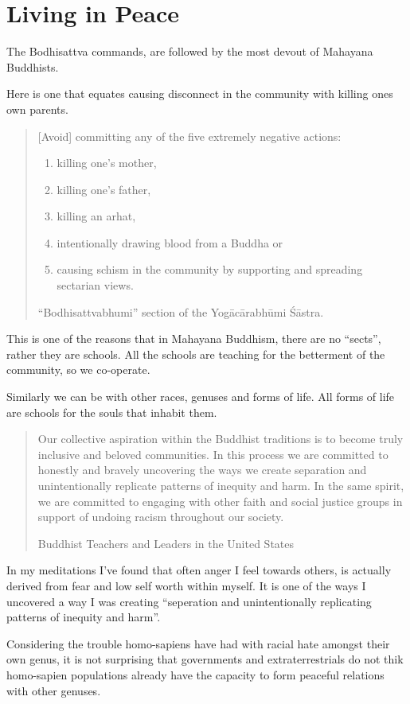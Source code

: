 
\chapter{Living in Peace}
\label{peace}

The Bodhisattva commands, are followed by the most devout of Mahayana Buddhists.

Here is one that equates causing disconnect in the community with killing ones
own parents. 
\blockquote[``Bodhisattvabhumi'' section of the Yogācārabhūmi Śāstra.]{[Avoid] 
committing any of the five extremely negative actions: 
\begin{enumerate}
  \item killing one's mother, 
  \item killing one's father, 
  \item killing an arhat, 
  \item intentionally drawing blood from a Buddha or 
  \item causing schism in the community by supporting and spreading sectarian views. 
\end{enumerate}
}

This is one of the reasons that in Mahayana Buddhism, there are no ``sects'', 
rather they are schools. All the schools are teaching for the betterment of the
community, so we co-operate. 

Similarly we can be with other races, genuses and forms of life. All forms of
life are schools for the souls that inhabit them.

\blockquote[Buddhist Teachers and Leaders in the United States\cite{racial}]{Our
 collective aspiration within the Buddhist traditions is to become truly 
inclusive and beloved communities.  In this process we are committed to 
honestly and bravely uncovering the ways we create separation and 
unintentionally replicate patterns of inequity and harm.  In the same spirit, 
we are committed to engaging with other faith and social justice groups in 
support of undoing racism throughout our society.
}

In my meditations I've found that often anger I feel towards others, is actually
derived from fear and low self worth within myself. It is one of the ways I
uncovered a way I was creating ``seperation and unintentionally replicating
patterns of inequity and harm''.

Considering the trouble homo-sapiens have had with racial hate amongst their 
own genus, it is not surprising that governments and extraterrestrials do not 
thik homo-sapien populations already have the capacity to form peaceful 
relations with other genuses.

